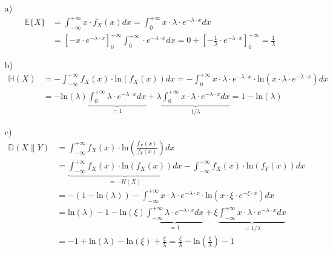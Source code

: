 \begin{itemize}
    \item[a)] 
    \begin{align*}
        \mathbb{E}\{X\} &=  
        \int_{-\infty}^{+\infty} x \cdot f_{X}(x) dx = 
        \int_{0}^{+\infty} x \cdot \lambda \cdot e^{-\lambda \cdot x} dx \\
        &= 
        \left[ -x \cdot e^{-\lambda \cdot x} \right]_{0}^{+\infty} \int_{0}^{+\infty} \cdot e^{-\lambda \cdot x} dx =
        0 + \left[ -\frac{1}{\lambda} \cdot e^{-\lambda \cdot x} \right]_{0}^{+\infty} = \frac{1}{\lambda}
    \end{align*}
    \item[b)]
        \begin{align*}
        \mathbb{H}(X) &=  
            -\int_{-\infty}^{+\infty} f_{X}(x) \cdot \text{ln} \left( f_{X}(x) \right) dx = 
            -\int_{0}^{+\infty} x \cdot \lambda \cdot e^{-\lambda \cdot x} \cdot \text{ln} \left( x \cdot \lambda \cdot e^{-\lambda \cdot x} \right) dx 
            \\ &=
            -\text{ln}(\lambda) \underbrace{\int_{0}^{+\infty} \lambda \cdot e^{-\lambda \cdot x} dx }_{=1} 
            + \lambda \underbrace{ \int_{0}^{+\infty} x \cdot \lambda \cdot e^{-\lambda \cdot x} dx }_{1/\lambda} = 1 - \text{ln}(\lambda)
    \end{align*}
    \item[c)]
    \begin{align*}
        \mathbb{D}(X\| Y) &=  
            \int_{-\infty}^{+\infty} f_{X}(x) \cdot \text{ln} \left( \frac{f_{X}(x)}{f_{Y}(x)} \right) dx 
            \\&= 
            \underbrace{\int_{-\infty}^{+\infty} f_{X}(x) \cdot \text{ln} \left( f_{X}(x) \right) dx }_{=-H(X)}
            - \int_{-\infty}^{+\infty} f_{X}(x) \cdot \text{ln} \left( f_{Y}(x) \right) dx
            \\ &=
            -(1 -\text{ln}(\lambda) ) - \int_{-\infty}^{+\infty} x \cdot \lambda \cdot e^{-\lambda \cdot x} \cdot \text{ln} \left( x \cdot \xi \cdot e^{-\xi \cdot x} \right) dx
            \\ &=
             \text{ln}(\lambda) -1 - \text{ln}(\xi) \underbrace{\int_{-\infty}^{+\infty} \lambda \cdot e^{-\lambda \cdot x} dx }_{=1} + \xi \underbrace{\int_{-\infty}^{+\infty} x \cdot \lambda \cdot e^{-\lambda \cdot x} dx }_{=1/\lambda}
            \\ &=
            -1 + \text{ln}(\lambda) - \text{ln}(\xi) + \frac{\xi}{\lambda} = \frac{\xi}{\lambda} - \text{ln}(\frac{\xi}{\lambda}) - 1
     \end{align*}
    

\end{itemize}

